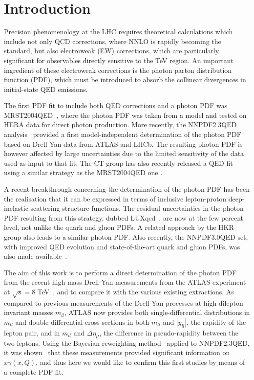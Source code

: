 \section{Introduction}

Precision phenomenology at the LHC requires theoretical calculations
which include not only QCD corrections, where NNLO is rapidly becoming
the standard, but also electroweak (EW) corrections, which are
particularly significant for observables directly sensitive to the TeV
region.
%
An important ingredient of these electroweak corrections is the photon
parton distribution function (PDF), which must be introduced to absorb
the collinear divergences in initial-state QED emissions.

The first PDF fit to include both QED corrections and a photon PDF was
MRST2004QED~\cite{Martin:2004dh}, where the photon PDF was taken from
a model and tested on HERA data for direct photon production.
%
More recently, the NNPDF2.3QED analysis~\cite{Ball:2013hta} provided a
first model-independent determination of the photon PDF based on
Drell-Yan data from ATLAS and LHCb.
%
The resulting photon PDF is however affected by large uncertainties
due to the limited sensitivity of the data used as input to that fit.
%
The CT group has also recently released a QED fit using a similar
strategy as the MRST2004QED one \cite{Schmidt:2014aba}.

A recent breakthrough concerning the determination of the photon PDF
has been the realisation that it can be expressed in terms of
inclusive lepton-proton deep-inelastic scattering structure functions.
%
The residual uncertainties in the photon PDF resulting from this
strategy, dubbed LUXqed~\cite{Manohar:2016nzj}, are now at the few
percent level, not unlike the quark and gluon PDFs.
%
A related approach by the HKR~\cite{Harland-Lang:2016apc}
group also leads to a similar photon PDF.
%
Also recently, the NNPDF3.0QED set, with improved
QED evolution and state-of-the-art quark and gluon
PDFs, was also made available~\cite{Bertone:2016ume,Ball:2014uwa}.

The aim of this work is to perform a direct determination of the
photon PDF from the recent high-mass Drell-Yan measurements from the
ATLAS experiment at $\sqrt{s}=8$ TeV~\cite{Aad:2016zzw}, and to
compare it with the various existing extractions.
%
As compared to previous measurements of the Drell-Yan processes at
high dilepton invariant masses $m_{ll}$, ATLAS now provides both
single-differential distributions in $m_{ll}$ and double-differential
cross sections in both $m_{ll}$ and $|y_{ll}|$, the rapidity of the
lepton pair, and in $m_{ll}$ and $\Delta\eta_{ll}$, the difference in
pseudo-rapidity between the two leptons.
%
Using the Bayesian reweighting method~\cite{Ball:2011gg,Ball:2010gb}
applied to NNPDF2.3QED, it was shown~\cite{Aad:2016zzw} that these
measurements provided significant information on $x\gamma(x,Q)$, and
thus here we would like to confirm this first studies by means of a
complete PDF fit.

